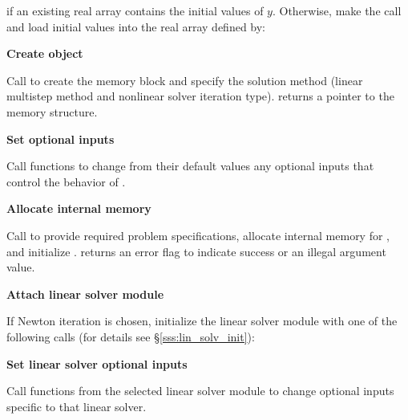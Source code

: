 \begin{Steps}
  {\s} 

  {\p} 

  if an existing real array  contains the initial values of $y$.  
  Otherwise, make the call  and load 
  initial values into the real array defined by:

  {\s} 

  {\p} 
  
\item\label{i:cvode_create} 
  {\bf Create {\cvodes} object}

  Call  
  to create the {\cvodes} memory block and specify the solution method
  (linear multistep method and nonlinear solver iteration type).
   returns a pointer to the {\cvodes} memory structure.

\item
  {\bf Set optional inputs}

  Call  functions to change from their default values any
  optional inputs that control the behavior of {\cvodes}.

\item\label{i:cvode_malloc} 
  {\bf Allocate internal memory}

  Call  
  to provide required problem specifications,
  allocate internal memory for {\cvodes}, 
  and initialize {\cvodes}.
   returns an error flag to indicate success or an illegal argument value.
  
\item\label{i:lin_solver} 
  {\bf Attach linear solver module}

  If Newton iteration is chosen, initialize the linear solver module
  with one of the following calls (for details see \S\ref{sss:lin_solv_init}):

  {\s} 

  {\s} 


  
\item
  {\bf Set linear solver optional inputs}

  Call  functions from the selected linear solver module to
  change optional inputs specific to that linear solver.


\end{Steps}
